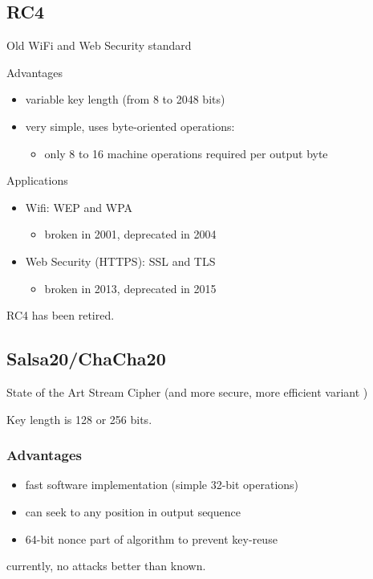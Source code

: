 \documentclass[draft]{article}
\begin{document}
\begin{multicols}{2}
    \subsection{RC4}
    Old WiFi and Web Security standard

    Advantages
    \begin{itemize}[nosep]
        \item variable key length (from 8 to 2048 bits)
        \item very simple, uses byte-oriented operations:
              \begin{itemize}[nosep]\item only 8 to 16 machine operations required per output byte\end{itemize}
    \end{itemize}
    Applications
    \begin{itemize}[nosep]
        \item Wifi: WEP and WPA
              \begin{itemize}[nosep]\item broken in 2001, deprecated in 2004\end{itemize}
        \item Web Security (HTTPS): SSL and TLS
              \begin{itemize}[nosep]\item broken in 2013, deprecated in 2015\end{itemize}
    \end{itemize}
    RC4 has been retired.
    \subsection{Salsa20/ChaCha20}
    State of the Art Stream Cipher
     (and more secure, more efficient variant )

    Key length is 128 or 256 bits.

    \subsubsection*{Advantages}
    \begin{itemize}[nosep]
        \item fast software implementation (simple 32-bit operations)
        \item can seek to any position in output sequence
        \item 64-bit nonce part of algorithm to prevent key-reuse
    \end{itemize}
    currently, no attacks better than  known.


\end{multicols}
\end{document}
